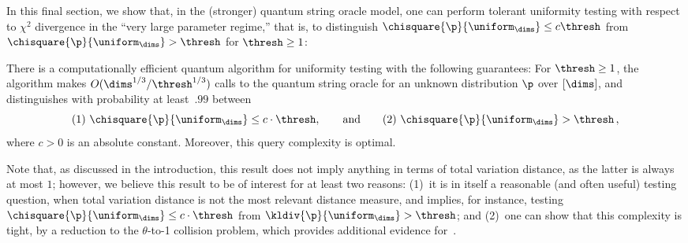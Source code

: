\documentclass[11pt]{article}
\begin{document}
In this final section, we show that, in the (stronger) quantum string oracle model, one can perform tolerant uniformity testing with respect to $\chi^2$ divergence in the ``very large parameter regime,'' that is, to distinguish $\chisquare{\p}{\uniform_\dims} \leq c \thresh$ from $\chisquare{\p}{\uniform_\dims} > \thresh$ for $\thresh \geq 1$: 
\begin{theorem}\label{thm:giant}
  There is a computationally efficient quantum algorithm for uniformity testing with the following guarantees: For $\thresh\geq 1$, the algorithm makes $O(\dims^{1/3}/\thresh^{1/3})$ calls to the quantum string oracle for an unknown distribution $\p$ over $[\dims]$, and distinguishes with probability at least~$.99$ between 
  \begin{equation}
      (1)~\chisquare{\p}{\uniform_\dims} \leq c\cdot \thresh, 
      \qquad \textrm{and} \qquad (2)~\chisquare{\p}{\uniform_\dims} > \thresh\,,    
  \end{equation}
  where $c>0$ is an absolute constant. Moreover, this query complexity is optimal.
\end{theorem}
Note that, as discussed in the introduction, this result does not imply anything in terms of total variation distance, as the latter is always at most $1$; however, we believe this result to be of interest for at least two reasons: (1)~it is in itself a reasonable (and often useful) testing question, when total variation distance is not the most relevant distance measure, and implies, for instance, testing $\chisquare{\p}{\uniform_\dims} \leq c\cdot \thresh$ from $\kldiv{\p}{\uniform_\dims} > \thresh$; and (2)~one can show that this complexity is tight, by a reduction to the $\theta$-to-1 collision problem, which provides additional evidence for~. 
\end{document}
